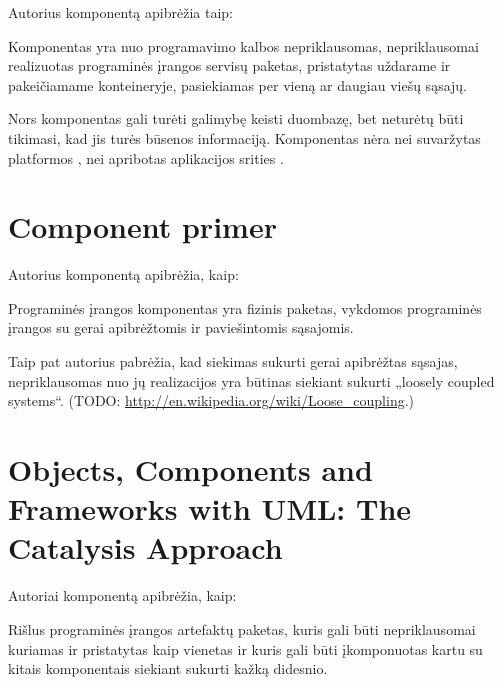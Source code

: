Autorius komponentą apibrėžia taip\cite{Sparling:2000:LLT:352183.352202}:
\begin{defn}[Komponentas]
  Komponentas yra nuo programavimo kalbos nepriklausomas, nepriklausomai
  realizuotas programinės įrangos servisų paketas, pristatytas
  uždarame  ir pakeičiamame konteineryje, pasiekiamas
  per vieną ar daugiau viešų sąsajų.

  Nors komponentas gali turėti galimybę keisti duombazę, bet neturėtų
  būti tikimasi, kad jis turės būsenos informaciją. Komponentas nėra
  nei suvaržytas platformos , nei apribotas
  aplikacijos srities .
\end{defn}

\section{Component primer}

Autorius komponentą apibrėžia, kaip\cite{Hopkins:2000:CP:352183.352198}:
\begin{defn}[Komponentas]
  Programinės įrangos komponentas yra fizinis paketas, vykdomos
   programinės įrangos su gerai apibrėžtomis ir
  paviešintomis sąsajomis.
\end{defn}

Taip pat autorius pabrėžia, kad siekimas sukurti gerai apibrėžtas sąsajas,
nepriklausomas nuo jų realizacijos yra būtinas siekiant sukurti
„loosely coupled systems“.
(TODO: \url{http://en.wikipedia.org/wiki/Loose_coupling}.)

\section{Objects, Components and Frameworks with UML: The Catalysis
Approach}

Autoriai komponentą apibrėžia,
kaip\cite[385]{objects-components-and-frameworks-with-uml}:
\begin{defn}
  Rišlus programinės įrangos artefaktų paketas, kuris gali būti
  nepriklausomai kuriamas ir pristatytas  kaip vienetas
  ir kuris gali būti įkomponuotas kartu su kitais komponentais siekiant
  sukurti kažką didesnio.
\end{defn}

